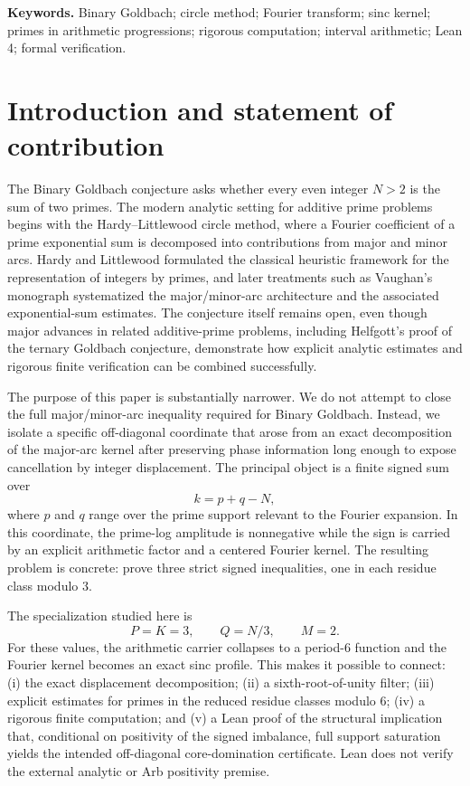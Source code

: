 \documentclass[11pt]{article}
\theoremstyle{definition}
\begin{document}
\noindent\textbf{Keywords.} Binary Goldbach; circle method; Fourier transform; sinc kernel; primes in arithmetic progressions; rigorous computation; interval arithmetic; Lean 4; formal verification.

\section{Introduction and statement of contribution}

The Binary Goldbach conjecture asks whether every even integer $N>2$ is the sum of two primes. The modern analytic setting for additive prime problems begins with the Hardy--Littlewood circle method, where a Fourier coefficient of a prime exponential sum is decomposed into contributions from major and minor arcs. Hardy and Littlewood formulated the classical heuristic framework for the representation of integers by primes, and later treatments such as Vaughan's monograph systematized the major/minor-arc architecture and the associated exponential-sum estimates. The conjecture itself remains open, even though major advances in related additive-prime problems, including Helfgott's proof of the ternary Goldbach conjecture, demonstrate how explicit analytic estimates and rigorous finite verification can be combined successfully.

The purpose of this paper is substantially narrower. We do not attempt to close the full major/minor-arc inequality required for Binary Goldbach. Instead, we isolate a specific off-diagonal coordinate that arose from an exact decomposition of the major-arc kernel after preserving phase information long enough to expose cancellation by integer displacement. The principal object is a finite signed sum over
\[
k=p+q-N,
\]
where $p$ and $q$ range over the prime support relevant to the Fourier expansion. In this coordinate, the prime-log amplitude is nonnegative while the sign is carried by an explicit arithmetic factor and a centered Fourier kernel. The resulting problem is concrete: prove three strict signed inequalities, one in each residue class modulo $3$.

The specialization studied here is
\begin{equation}\label{eq:specialization}
P=K=3,\qquad Q=N/3,\qquad M=2.
\end{equation}
For these values, the arithmetic carrier collapses to a period-$6$ function and the Fourier kernel becomes an exact sinc profile. This makes it possible to connect: (i) the exact displacement decomposition; (ii) a sixth-root-of-unity filter; (iii) explicit estimates for primes in the reduced residue classes modulo $6$; (iv) a rigorous finite computation; and (v) a Lean proof of the structural implication that, conditional on positivity of the signed imbalance, full support saturation yields the intended off-diagonal core-domination certificate. Lean does not verify the external analytic or Arb positivity premise.
\end{document}
